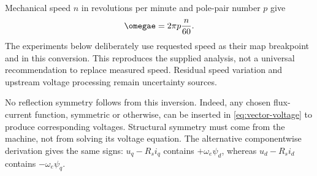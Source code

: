 Mechanical speed $n$ in revolutions per minute and pole-pair number $p$ give
\begin{equation}
 \omegae=2\pi p\frac{n}{60}.\label{eq:rpm-conversion}
\end{equation}
The experiments below deliberately use requested speed as their map
breakpoint and in this conversion. This reproduces the supplied analysis,
not a universal recommendation to replace measured speed. Residual speed
variation and upstream voltage processing remain uncertainty sources.

No reflection symmetry follows from this inversion. Indeed, any chosen
flux-current function, symmetric or otherwise, can be inserted in
\cref{eq:vector-voltage} to produce corresponding voltages. Structural
symmetry must come from the machine, not from solving its voltage equation.
The alternative componentwise derivation gives the same signs: $u_q-R_si_q$
contains $+\omega_e\psi_d$, whereas $u_d-R_si_d$ contains
$-\omega_e\psi_q$.

